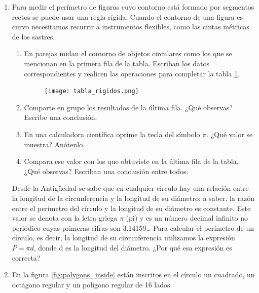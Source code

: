 \documentclass[11pt]{book}
\begin{document}
\begin{enumerate}
  \item Para medir el perímetro de figuras cuyo contorno está formado por segmentos
        rectos se puede usar una regla rígida. Cuando el contorno de una figura es
        curvo necesitamos recurrir a instrumentos flexibles, como las cintas métricas
        de los sastres.
        \begin{enumerate}
          \item En parejas midan el contorno de objetos circulares como los que se mencionan en
                la primera fila de la tabla. Escriban los datos correspondientes y realicen las
                operaciones para completar la tabla \ref{tab:tabla_rigidos}.\\

                \begin{figure}[H]
                  \centering
                  \texttt{[image: tabla\_rigidos.png]}
                  \label{tab:tabla_rigidos}
                \end{figure}

          \item Comparte en grupo los resultados de la última fila. ¿Qu\'e observas? Escribe una conclusión.
          \item En una calculadora científica oprime la tecla del símbolo $\pi$. ¿Qué valor se muestra? Anótenlo.
          \item Compara ese valor con los que obtuviste en la última fila de la tabla. ¿Qué observas?
                Escriban una conclusión entre todos.
        \end{enumerate}

        \begin{boxH}
          Desde la Antigüedad se sabe que en cualquier círculo hay una relación entre la longitud de la
          circunferencia y la longitud de su diámetro; a saber, la razón entre el perímetro del círculo y
          la longitud de su diámetro es constante.
          Este valor se denota con la letra griega $\pi$ (pi) y es un número decimal infinito no periódico
          cuyas primeras cifras son 3.14159\dots
          Para calcular el perímetro de un círculo, es decir, la longitud de su circunferencia utilizamos
          la expresión $P =\pi d$, donde d es la longitud del diámetro. ¿Por qué esa expresión es correcta?
        \end{boxH}

  \item En la figura \ref{fig:polygons_inside} están inscritos en el círculo un cuadrado,
        un octágono regular y un polígono regular de 16 lados.


\end{enumerate}
\end{document}

